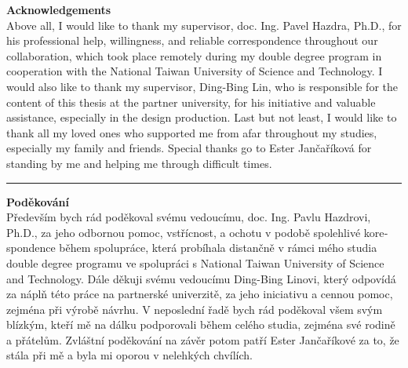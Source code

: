 \clearpage
\vspace*{\fill}
\noindent\textbf{Acknowledgements}\\[0.25cm]
Above all, I would like to thank my supervisor, doc. Ing. Pavel Hazdra, Ph.D., for his professional help, willingness, and reliable correspondence throughout our collaboration, which took place remotely during my double degree program in cooperation with the National Taiwan University of Science and Technology. I would also like to thank my supervisor, Ding-Bing Lin, who is responsible for the content of this thesis at the partner university, for his initiative and valuable assistance, especially in the design production. Last but not least, I would like to thank all my loved ones who supported me from afar throughout my studies, especially my family and friends. Special thanks go to Ester \foreignlanguage{czech}{Jančaříková} for standing by me and helping me through difficult times.\\
\hrule\vspace*{1cm}
\begin{otherlanguage}{czech}
    \noindent\textbf{Poděkování}\\[0.25cm]
    Především bych rád poděkoval svému vedoucímu, doc. Ing. Pavlu Hazdrovi, Ph.D., za jeho odbornou pomoc, vstřícnost, a ochotu v podobě spolehlivé korespondence během spolupráce, která probíhala distančně v rámci mého studia double degree programu ve spolupráci s National Taiwan University of Science and Technology. Dále děkuji svému vedoucímu Ding-Bing Linovi, který odpovídá za náplň této práce na partnerské univerzitě, za jeho iniciativu a cennou pomoc, zejména při výrobě návrhu. V neposlední řadě bych rád poděkoval všem svým blízkým, kteří mě na dálku podporovali během celého studia, zejména své rodině a přátelům. Zvláštní poděkování na závěr potom patří Ester Jančaříkové za to, že stála při mě a byla mi oporou v nelehkých chvílích.
\end{otherlanguage}
\clearpage